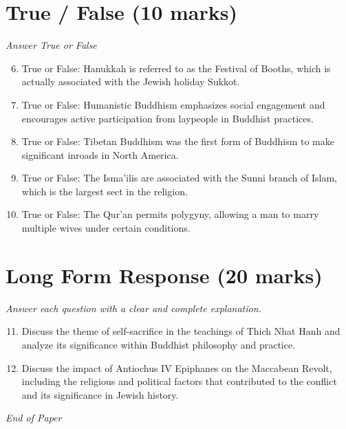 \documentclass[12pt]{article}
\begin{document}
\section*{True / False (10 marks)}
\textit{Answer True or False}
\begin{enumerate}[label=\arabic*.]
\setcounter{enumi}{5}
\item True or False: Hanukkah is referred to as the Festival of Booths, which is actually associated with the Jewish holiday Sukkot.
\item True or False: Humanistic Buddhism emphasizes social engagement and encourages active participation from laypeople in Buddhist practices.
\item True or False: Tibetan Buddhism was the first form of Buddhism to make significant inroads in North America.
\item True or False: The Isma'ilis are associated with the Sunni branch of Islam, which is the largest sect in the religion.
\item True or False: The Qur'an permits polygyny, allowing a man to marry multiple wives under certain conditions.
\end{enumerate}

\section*{Long Form Response (20 marks)}
\textit{Answer each question with a clear and complete explanation.}
\begin{enumerate}[label=\arabic*.]
\setcounter{enumi}{10}
\item Discuss the theme of self-sacrifice in the teachings of Thich Nhat Hanh and analyze its significance within Buddhist philosophy and practice.
\item Discuss the impact of Antiochus IV Epiphanes on the Maccabean Revolt, including the religious and political factors that contributed to the conflict and its significance in Jewish history.
\end{enumerate}

\vfill
\noindent\textit{End of Paper}
\end{document}
